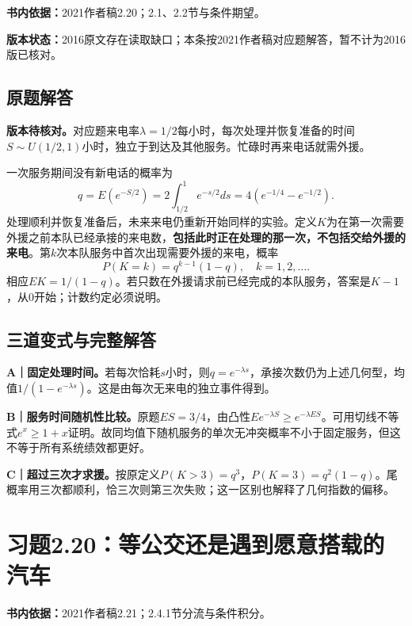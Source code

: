\documentclass[
  11pt,
  a4paper,
  UTF8,fontset=fandol]{ctexart}
\let\OldSection\section
\renewcommand{\section}{\Needspace{7\baselineskip}\OldSection}
\let\OldSubsection\subsection
\renewcommand{\subsection}{\Needspace{5\baselineskip}\OldSubsection}
\begin{document}
\textbf{书内依据：}2021作者稿2.20；2.1、2.2节与条件期望。

\textbf{版本状态：}2016原文存在读取缺口；本条按2021作者稿对应题解答，暂不计为2016版已核对。

\subsection{原题解答}\label{ux539fux9898ux89e3ux7b54-18}

\textbf{版本待核对。}对应题来电率\(\lambda=1/2\)每小时，每次处理并恢复准备的时间\(S\sim U(1/2,1)\)小时，独立于到达及其他服务。忙碌时再来电话就需外援。

一次服务期间没有新电话的概率为
\[q=E(e^{-S/2})=2\int_{1/2}^{1}e^{-s/2}ds=4(e^{-1/4}-e^{-1/2}).\]
处理顺利并恢复准备后，未来来电仍重新开始同样的实验。定义\(K\)为在第一次需要外援之前本队已经承接的来电数，\textbf{包括此时正在处理的那一次，不包括交给外援的来电}。第\(k\)次本队服务中首次出现需要外援的来电，概率
\[\boxed{P(K=k)=q^{k-1}(1-q),\quad k=1,2,\ldots.}\]
相应\(EK=1/(1-q)\)。若只数在外援请求前已经完成的本队服务，答案是\(K-1\)，从0开始；计数约定必须说明。

\subsection{三道变式与完整解答}\label{ux4e09ux9053ux53d8ux5f0fux4e0eux5b8cux6574ux89e3ux7b54-18}

\textbf{A｜固定处理时间。}若每次恰耗\(s\)小时，则\(q=e^{-\lambda s}\)，承接次数仍为上述几何型，均值\(1/(1-e^{-\lambda s})\)。这是由每次无来电的独立事件得到。

\textbf{B｜服务时间随机性比较。}原题\(ES=3/4\)，由凸性\(Ee^{-\lambda S}\ge e^{-\lambda ES}\)。可用切线不等式\(e^x\ge1+x\)证明。故同均值下随机服务的单次无冲突概率不小于固定服务，但这不等于所有系统绩效都更好。

\textbf{C｜超过三次才求援。}按原定义\(P(K>3)=q^3\)，\(P(K=3)=q^2(1-q)\)。尾概率用三次都顺利，恰三次则第三次失败；这一区别也解释了几何指数的偏移。

\newpage

\section{习题2.20：等公交还是遇到愿意搭载的汽车}\label{ux4e60ux98982.20ux7b49ux516cux4ea4ux8fd8ux662fux9047ux5230ux613fux610fux642dux8f7dux7684ux6c7dux8f66}

\textbf{书内依据：}2021作者稿2.21；2.4.1节分流与条件积分。
\end{document}
